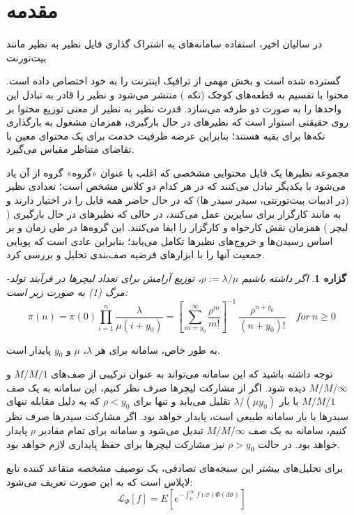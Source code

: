 \documentclass[11pt, oneside]{article}
\newcommand{\ev}[2]{%
    #1\endnote{\noindent\hbox to 0.2\textwidth{#1}\lr{#2} }%
}
\newtheorem{proposition}{گزاره}
\begin{document}
\section{مقدمه}
در سالیان اخیر، استفاده سامانه‌های به اشتراک گذاری فایل نظیر به نظیر مانند 
\ev{بیت‌تورنت}{‌Bittorent}
\cite{c1} %
گسترده شده است و بخش مهمی از ترافیک اینترنت را به خود اختصاص داده است. محتوا با تقسیم به قطعه‌های کوچک (تکه%
)%
منتشر می‌شود و نظیر را قادر به تبادل این واحدها را به صورت دو طرفه می‌سازد. قدرت نظیر به نظیر از معنی توزیع محتوا بر روی حقیقتی استوار است که نظیرهای در حال بارگیری، همزمان مشغول به بارگذاری تکه‌ها برای بقیه هستند؛ بنابراین عرضه ظرفیت خدمت برای یک محتوای معین با تقاضای متناظر مقیاس می‌گیرد.
\par
مجموعه نظیرها یک فایل محتوایی مشخصی که اغلب با عنوان «گروه»%
\ev{گروه}{Swarm} %
از آن یاد می‌شود با یکدیگر تبادل می‌کنند که در هر کدام دو کلاس مشخص است؛ تعدادی نظیر (در ادبیات بیت‌تورنتی، سیدر%
\ev{سیدر}{Seeder} %
ها) که در حال حاضر همه فایل را در اختیار دارند و به مانند کارگزار برای سایرین عمل می‌کنند، در حالی که نظیرهای در حال بارگیری (%
\ev{لیچر}{Leecher}) %
همزمان نقش کارخواه و کارگزار را ایفا می‌کنند. این گروه‌ها در طی زمان و بر اساس رسیدن‌ها و خروج‌های نظیرها تکامل می‌یابد؛ بنابراین عادی است که پویایی جمعیت‌ آنها را با ابزارهای فرضیه صف‌بندی تحلیل و بررسی کرد.
\begin{proposition}
اگر داشته باشیم $\rho:=\lambda/\mu$، توزیع آرامش برای تعداد لیچرها در فرآیند تولد-مرگ (1) به صورت زیر است:
\begin{equation}
\pi(n)=\pi(0)\prod_{i=1}^{n}\frac{\lambda}{\mu (i+y_0)}=\left[\sum_{m=y_0}^{\infty}\frac{\rho^m}{m!}\right]^{-1}\ \frac{\rho^{n+y_0}}{(n+y_0)!}\quad for\ n \geq 0
\end{equation}
\end{proposition}
به طور خاص، سامانه برای هر $\lambda$، $\mu$ و $y_0$ پایدار است.
\par
توجه داشته باشید که این سامانه می‌تواند به عنوان ترکیبی از صف‌های $M/M/1$ و $M/M/\infty$ دیده شود. اگر از مشارکت لیچرها صرف نظر کنیم، این سامانه به یک صف $M/M/1$ با بار $\lambda/(\mu y_0)$ تقلیل می‌یابد و تنها برای $\rho<y_0$ که به دلیل مقابله تنهای سیدرها با بار سامانه طبیعی است، پایدار خواهد بود. اگر مشارکت سیدرها صرف نظر کنیم، سامانه به یک صف $M/M/\infty$ تبدیل می‌شود و سامانه برای تمام مقادیر $\rho$ پایدار خواهد بود. در حالت $\rho>y_0$ نیز مشارکت لیچرها برای حفظ پایداری لازم خواهد بود.
\par
برای تحلیل‌های بیشتر این سنجه‌های تصادفی، یک توصیف مشخصه متقاعد کننده تابع لاپلاس است که به این صورت تعریف می‌شود:
\begin{equation*}
\mathcal{L}_\Phi\left[f\right]=E\left[e^{-\int_{0}^{\infty}f(\sigma)\Phi(d\sigma)}\right]
\end{equation*}
\end{document}
